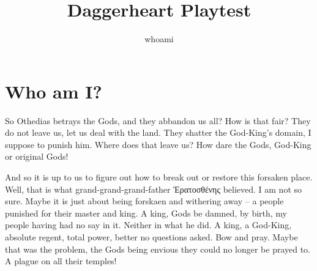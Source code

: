 \documentclass[a4paper, twoside, russian, ngerman]{book}%
\title{Daggerheart Playtest}
\author{whoami}
\begin{document}
\maketitle

\tableofcontents

\setlength{\parskip}{1ex}

\chapter{Who am I?}

So Othedias betrays the Gods, and they abbandon us all? How is that fair? They do not leave us, let us deal with the land. They shatter the God-King's domain, I suppose to punish him. Where does that leave us? How dare the Gods, God-King or original Gods!

And so it is up to us to figure out how to break out or restore this forsaken place. Well, that is what grand-grand-grand-father Ἐρατοσθένης believed. I am not so sure. Maybe it is just about being forskaen and withering away -- a people punished for their master and king. A king, Gods be damned, by birth, my people having had no say in it. Neither in what he did. A king, a God-King, absolute regent, total power, better no questions asked. Bow and pray. Maybe that was the problem, the Gods being envious they could no longer be prayed to. A plague on all their temples!
\end{document}
